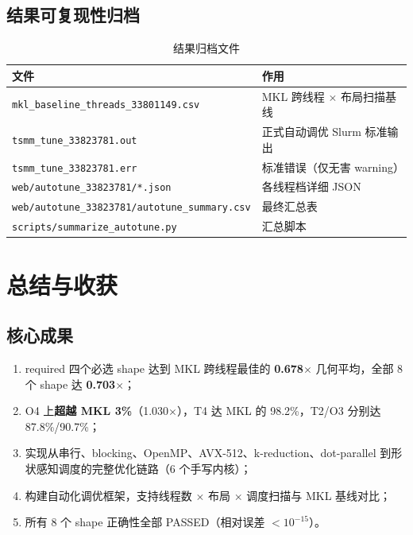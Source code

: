 \documentclass[11pt,a4paper,fontset=fandol]{ctexart}
\begin{document}
\subsection{结果可复现性归档}
\begin{table}[H]
\centering
\caption{结果归档文件}
\small
\begin{tabular}{ll}
\toprule
文件 & 作用 \\
\midrule
\texttt{mkl\_baseline\_threads\_33801149.csv} & MKL 跨线程 $\times$ 布局扫描基线 \\
\texttt{tsmm\_tune\_33823781.out} & 正式自动调优 Slurm 标准输出 \\
\texttt{tsmm\_tune\_33823781.err} & 标准错误（仅无害 warning） \\
\texttt{web/autotune\_33823781/*.json} & 各线程档详细 JSON \\
\texttt{web/autotune\_33823781/autotune\_summary.csv} & 最终汇总表 \\
\texttt{scripts/summarize\_autotune.py} & 汇总脚本 \\
\bottomrule
\end{tabular}
\end{table}

\section{总结与收获}

\subsection{核心成果}
\begin{enumerate}[leftmargin=2.4em]
  \item required 四个必选 shape 达到 MKL 跨线程最佳的 \textbf{0.678$\times$} 几何平均，全部 8 个 shape 达 \textbf{0.703$\times$}；
  \item O4 上\textbf{超越 MKL 3\%}（1.030$\times$），T4 达 MKL 的 98.2\%，T2/O3 分别达 87.8\%/90.7\%；
  \item 实现从串行、blocking、OpenMP、AVX-512、k-reduction、dot-parallel 到形状感知调度的完整优化链路（6 个手写内核）；
  \item 构建自动化调优框架，支持线程数 $\times$ 布局 $\times$ 调度扫描与 MKL 基线对比；
  \item 所有 8 个 shape 正确性全部 PASSED（相对误差 $<10^{-15}$）。
\end{enumerate}
\end{document}

